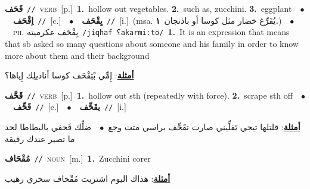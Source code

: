 \documentclass[10pt,a4paper,twoside]{article} %
\begin{document}
\begin{multicols}{2}
{\setlength\topsep{0pt}\textbf{\foreignlanguage{arabic}{قَحَف}}\ {\color{gray}\texttt{//}\color{black}}\ \textsc{verb}\ [p.]\ \textbf{1.}~hollow out vegetables.  \textbf{2.}~such as, zucchini.  \textbf{3.}~eggplant\ \ $\bullet$\ \ \setlength\topsep{0pt}\textbf{\foreignlanguage{arabic}{اِقْحَف}}\ {\color{gray}\texttt{//}\color{black}}\ [c.]\ \ $\bullet$\ \ \setlength\topsep{0pt}\textbf{\foreignlanguage{arabic}{يِقْحَف}}\ {\color{gray}\texttt{//}\color{black}}\ [i.]\ \color{gray}(msa. \foreignlanguage{arabic}{يُفَرِّغ خضار مثل كوسا أو باذنجان}~\foreignlanguage{arabic}{\textbf{١.}})\color{black}\ \ $\bullet$\ \ \textsc{ph.} \color{gray} \foreignlanguage{arabic}{يِقْحَف عكرميته}\color{black}\ {\color{gray}\texttt{/{\sffamily jiqħaf ʕakarmiːto}/}\color{black}}\ \textbf{1.}~It is an expression that means that sb asked so many questions about someone and his family in order to know more about them and their background\  \begin{flushright}\color{gray}\foreignlanguage{arabic}{\textbf{\underline{\foreignlanguage{arabic}{أمثلة}}}: إِمِّي بْتِقْحَف كوسا أناديلِك إِياها؟}\end{flushright}\color{black}} \vspace{2mm}

{\setlength\topsep{0pt}\textbf{\foreignlanguage{arabic}{قَحَّف}}\ {\color{gray}\texttt{//}\color{black}}\ \textsc{verb}\ [p.]\ \textbf{1.}~hollow out sth (repeatedly with force).  \textbf{2.}~scrape sth off\ \ $\bullet$\ \ \setlength\topsep{0pt}\textbf{\foreignlanguage{arabic}{قَحِّف}}\ {\color{gray}\texttt{//}\color{black}}\ [c.]\ \ $\bullet$\ \ \setlength\topsep{0pt}\textbf{\foreignlanguage{arabic}{يقَحِّف}}\ {\color{gray}\texttt{//}\color{black}}\ [i.]\  \begin{flushright}\color{gray}\foreignlanguage{arabic}{\textbf{\underline{\foreignlanguage{arabic}{أمثلة}}}: قلتلها تيجي تَفلِّيني صارت تقَحِّف براسي متت وجع\ $\bullet$\ \  ضلِّك قَحفي بالبطاطا لحد ما تصير عندك رقيقة}\end{flushright}\color{black}} \vspace{2mm}

{\setlength\topsep{0pt}\textbf{\foreignlanguage{arabic}{مُقْحَاف}}\ {\color{gray}\texttt{//}\color{black}}\ \textsc{noun}\ [m.]\ \textbf{1.}~Zucchini corer\  \begin{flushright}\color{gray}\foreignlanguage{arabic}{\textbf{\underline{\foreignlanguage{arabic}{أمثلة}}}: هذاك اليوم اشتريت مُقْحاف سحري رهيب}\end{flushright}\color{black}} \vspace{2mm}


\end{multicols}
\end{document}
